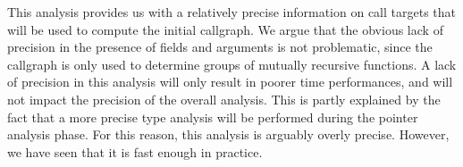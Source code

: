This analysis provides us with a relatively precise information on call targets
that will be used to compute the initial callgraph. We argue that the obvious
lack of precision in the presence of fields and arguments is not problematic,
since the callgraph is only used to determine groups of mutually recursive
functions. A lack of precision in this analysis will only result in poorer time
performances, and will not impact the precision of the overall analysis. This
is partly explained by the fact that a more precise type analysis will be
performed during the pointer analysis phase. For this reason, this analysis is
arguably overly precise. However, we have seen that it is fast enough in
practice.

